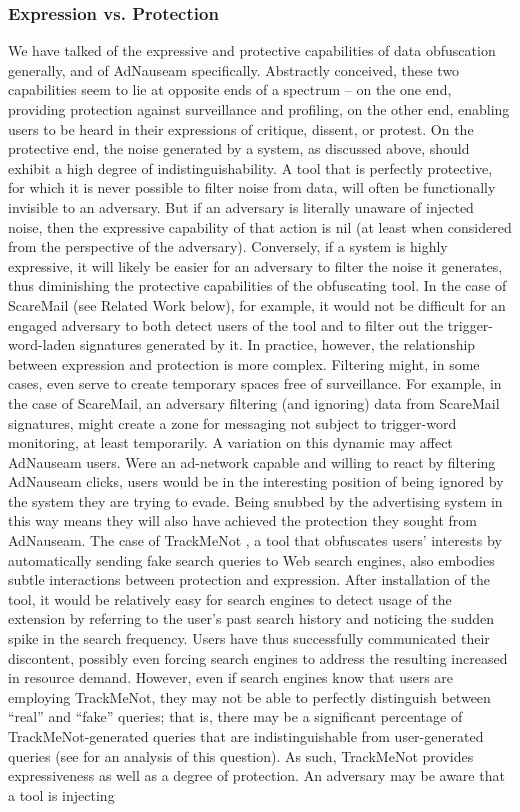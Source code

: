 \documentclass[conference]{IEEEtran}
\begin{document}
\subsubsection{Expression vs. Protection}

We have talked of the expressive and protective capabilities of data obfuscation generally, and of AdNauseam specifically. Abstractly conceived, these two capabilities seem to lie at opposite ends of a spectrum -- on the one end, providing protection against surveillance and profiling, on the other end, enabling users to be heard in their expressions of critique, dissent, or protest. On the protective end, the noise generated by a system, as discussed above, should exhibit a high degree of indistinguishability. A tool that is perfectly protective, for which it is never possible to filter noise from data, will often be functionally invisible to an adversary. But if an adversary is literally unaware of injected noise, then the expressive capability of that action is nil (at least when considered from the perspective of the adversary). Conversely, if a system is highly expressive, it will likely be easier for an adversary to filter the noise it generates, thus diminishing the protective capabilities of the obfuscating tool. In the case of ScareMail (see Related Work below), for example, it would not be difficult for an engaged adversary to both detect users of the tool and to filter out the trigger-word-laden signatures generated by it. In practice, however, the relationship between expression and protection is more complex. Filtering might, in some cases, even serve to create temporary spaces free of surveillance. For example, in the case of ScareMail, an adversary filtering (and ignoring) data from ScareMail signatures, might create a zone for messaging not subject to trigger-word monitoring, at least temporarily. A variation on this dynamic may affect AdNauseam users. Were an ad-network capable and willing to react by filtering AdNauseam clicks, users would be in the interesting position of being ignored by the system they are trying to evade. Being snubbed by the advertising system in this way means they will also have achieved the protection they sought from AdNauseam. The case of TrackMeNot \cite{Howe-2}, a tool that obfuscates users' interests by automatically sending fake search queries to Web search engines, also embodies subtle interactions between protection and expression. After installation of the tool, it would be relatively easy for search engines to detect usage of the extension by referring to the user's past search history and noticing the sudden spike in the search frequency. Users have thus successfully communicated their discontent, possibly even forcing search engines to address the resulting increased in resource demand. However, even if search engines know that users are employing TrackMeNot, they may not be able to perfectly distinguish between ``real'' and ``fake'' queries; that is, there may be a significant percentage of TrackMeNot-generated queries that are indistinguishable from user-generated queries (see \cite{Gervais} for an analysis of this question). As such, TrackMeNot provides expressiveness as well as a degree of protection. An adversary may be aware that a tool is injecting 
\end{document}
